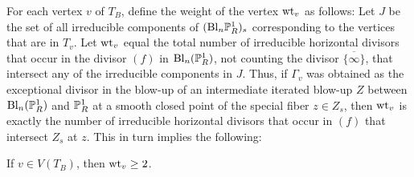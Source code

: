 For each vertex $v$ of $T_B$, define the weight of the vertex $\wt_v$ as follows: Let $J$ be the set of all irreducible components of $(\mathrm{Bl}_n{\P^1_R})_s$ corresponding to the vertices that are in $T_v$. Let $\wt_v$ equal the total number of irreducible horizontal divisors that occur in the divisor $(f)$ in $\mathrm{Bl}_n(\P^1_R)$, not counting the divisor $\overline{\{\infty\}}$, that intersect any of the irreducible components in $J$. Thus, if $\Gamma_v$ was obtained as the exceptional divisor in the blow-up of an intermediate iterated blow-up $Z$ between $\mathrm{Bl}_n(\P^1_R)$ and $\P^1_R$ at a smooth closed point of the special fiber $z \in Z_s$, then $\wt_v$ is exactly the number of irreducible horizontal divisors that occur in $(f)$ that intersect $Z_s$ at $z$. This in turn implies the following:
\begin{lemma}\label{weight}
If $v \in V(T_B)$, then $\wt_v \geq 2$.
\end{lemma}

